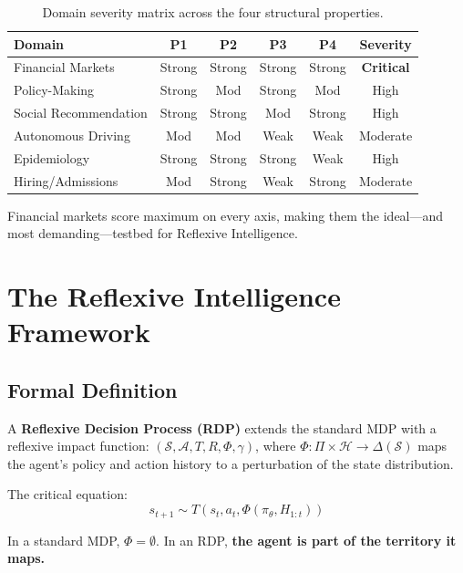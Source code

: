 \documentclass[11pt,a4paper]{article}
\begin{document}
\begin{table}[h]
\centering
\caption{Domain severity matrix across the four structural properties.}
\label{tab:severity}
\begin{tabular}{@{}lccccc@{}}
\toprule
\textbf{Domain} & \textbf{P1} & \textbf{P2} & \textbf{P3} & \textbf{P4} & \textbf{Severity} \\
\midrule
Financial Markets & Strong & Strong & Strong & Strong & \textbf{Critical} \\
Policy-Making & Strong & Mod & Strong & Mod & High \\
Social Recommendation & Strong & Strong & Mod & Strong & High \\
Autonomous Driving & Mod & Mod & Weak & Weak & Moderate \\
Epidemiology & Strong & Strong & Strong & Weak & High \\
Hiring/Admissions & Mod & Strong & Weak & Strong & Moderate \\
\bottomrule
\end{tabular}
\end{table}

Financial markets score maximum on every axis, making them the ideal---and most demanding---testbed for Reflexive Intelligence.

\section{The Reflexive Intelligence Framework}

\subsection{Formal Definition}

A \textbf{Reflexive Decision Process (RDP)} extends the standard MDP with a reflexive impact function: $(\mathcal{S}, \mathcal{A}, T, R, \Phi, \gamma)$, where $\Phi: \Pi \times \mathcal{H} \rightarrow \Delta(\mathcal{S})$ maps the agent's policy and action history to a perturbation of the state distribution.

The critical equation:
\begin{equation}
s_{t+1} \sim T(s_t, a_t, \Phi(\pi_\theta, H_{1:t}))
\end{equation}

In a standard MDP, $\Phi = \emptyset$. In an RDP, \textbf{the agent is part of the territory it maps.}
\end{document}
